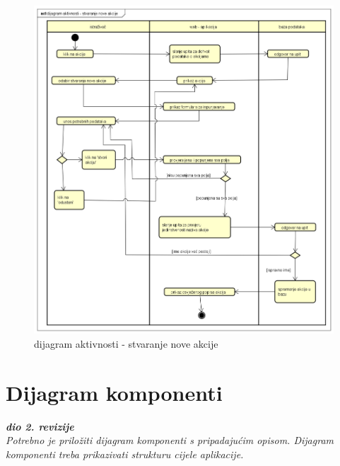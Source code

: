 		\begin{figure}[H]
			\includegraphics[scale=0.5]{slike/dijagram aktivnosti - stvaranje nove akcije.png}
			\centering
			\caption{dijagram aktivnosti - stvaranje nove akcije}
			\label{fig:dijagram aktivnosti - stvaranje nove akcije}
		\end{figure}

			\eject
		\section{Dijagram komponenti}
		
			\textbf{\textit{dio 2. revizije}}\\
		
			 \textit{Potrebno je priložiti dijagram komponenti s pripadajućim opisom. Dijagram komponenti treba prikazivati strukturu cijele aplikacije.}
